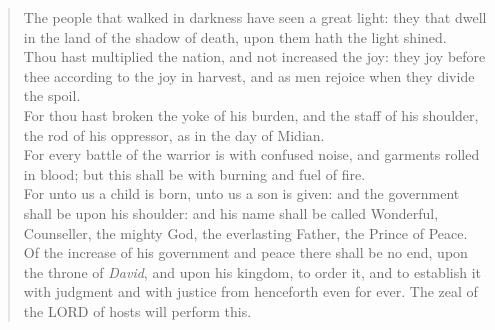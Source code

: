 \documentclass[MAIN]{subfiles}
\begin{document}
\begin{verse}
The people that walked in darkness have seen a great light: they that dwell in the land of the shadow of death, upon them hath the light shined.\\
Thou hast multiplied the nation, and not increased the joy: they joy before thee according to the joy in harvest, and as men rejoice when they divide the spoil.\\
For thou hast broken the yoke of his burden, and the staff of his shoulder, the rod of his oppressor, as in the day of Midian.\\
For every battle of the warrior is with confused noise, and garments rolled in blood; but this shall be with burning and fuel of fire.\\
For unto us a child is born, unto us a son is given: and the government shall be upon his shoulder: and his name shall be called Wonderful, Counseller, the mighty God, the everlasting Father, the Prince of Peace.\\
Of the increase of his government and peace there shall be no end, upon the throne of \emph{David}, and upon his kingdom, to order it, and to establish it with judgment and with justice from henceforth even for ever. The zeal of the {\hge LORD} of hosts will perform this.
\end{verse}
\end{document}
